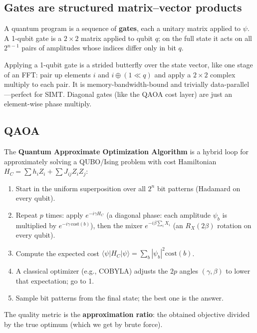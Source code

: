 \documentclass[11pt]{article}
\begin{document}
\subsection{Gates are structured matrix--vector products}

A quantum program is a sequence of \textbf{gates}, each a unitary matrix
applied to $\psi$. A 1-qubit gate is a $2\times2$ matrix applied to qubit $q$;
on the full state it acts on all $2^{n-1}$ pairs of amplitudes whose indices
differ only in bit $q$.

\begin{analogy}
Applying a 1-qubit gate is a strided butterfly over the state vector, like
one stage of an FFT: pair up elements $i$ and $i \oplus (1\ll q)$ and apply a
$2\times2$ complex multiply to each pair. It is memory-bandwidth-bound and
trivially data-parallel---perfect for SIMT. Diagonal gates (like the QAOA cost
layer) are just an element-wise phase multiply.
\end{analogy}

\subsection{QAOA}

The \textbf{Quantum Approximate Optimization Algorithm} is a hybrid loop for
approximately solving a QUBO/Ising problem with cost Hamiltonian
$H_C = \sum h_i Z_i + \sum J_{ij} Z_i Z_j$:
\begin{enumerate}[nosep]
  \item Start in the uniform superposition over all $2^n$ bit patterns
        (Hadamard on every qubit).
  \item Repeat $p$ times: apply $e^{-i\gamma H_C}$ (a diagonal phase: each
        amplitude $\psi_b$ is multiplied by $e^{-i\gamma\,\text{cost}(b)}$),
        then the mixer $e^{-i\beta\sum_i X_i}$ (an $R_X(2\beta)$ rotation on
        every qubit).
  \item Compute the expected cost $\langle\psi|H_C|\psi\rangle
        = \sum_b |\psi_b|^2 \text{cost}(b)$.
  \item A classical optimizer (e.g., COBYLA) adjusts the $2p$ angles
        $(\gamma,\beta)$ to lower that expectation; go to 1.
  \item Sample bit patterns from the final state; the best one is the
        answer.
\end{enumerate}
The quality metric is the \textbf{approximation ratio}: the obtained objective
divided by the true optimum (which we get by brute force).
\end{document}
